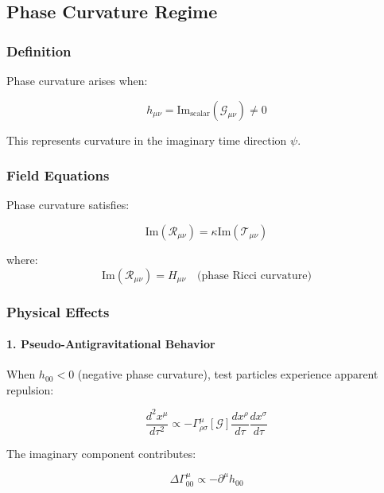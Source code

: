 \subsection{Phase Curvature Regime}

\subsubsection{Definition}

Phase curvature arises when:

\begin{equation}
h_{\mu\nu} = \text{Im}_{\text{scalar}}(\mathcal{G}_{\mu\nu}) \neq 0
\end{equation}

This represents curvature in the imaginary time direction $\psi$.

\subsubsection{Field Equations}

Phase curvature satisfies:

\begin{equation}
\text{Im}(\mathcal{R}_{\mu\nu}) = \kappa \text{Im}(\mathcal{T}_{\mu\nu})
\end{equation}

where:
\begin{equation}
\text{Im}(\mathcal{R}_{\mu\nu}) = H_{\mu\nu} \quad \text{(phase Ricci curvature)}
\end{equation}

\subsubsection{Physical Effects}

\paragraph{1. Pseudo-Antigravitational Behavior}

When $h_{00} < 0$ (negative phase curvature), test particles experience apparent repulsion:

\begin{equation}
\frac{d^2 x^\mu}{d\tau^2} \propto -\Gamma^\mu_{\rho\sigma}[\mathcal{G}] \frac{dx^\rho}{d\tau}\frac{dx^\sigma}{d\tau}
\end{equation}

The imaginary component contributes:

\begin{equation}
\Delta \Gamma^\mu_{00} \propto -\partial^\mu h_{00}
\end{equation}

